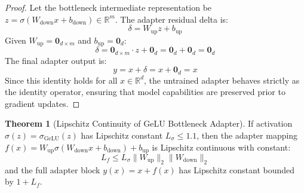 \documentclass[11pt,a4paper]{article}
\theoremstyle{definition}
\newtheorem{theorem}{\textbf{Theorem}}[section]
\begin{document}
\begin{proof}
Let the bottleneck intermediate representation be $z = \sigma(W_{\text{down}} x + b_{\text{down}}) \in \mathbb{R}^m$.
The adapter residual delta is:
{\boldmath
\begin{equation}
\delta = W_{\text{up}} z + b_{\text{up}}
\end{equation}
}
Given $W_{\text{up}} = \mathbf{0}_{d \times m}$ and $b_{\text{up}} = \mathbf{0}_d$:
{\boldmath
\begin{equation}
\delta = \mathbf{0}_{d \times m} \cdot z + \mathbf{0}_d = \mathbf{0}_d + \mathbf{0}_d = \mathbf{0}_d
\end{equation}
}
The final adapter output is:
{\boldmath
\begin{equation}
y = x + \delta = x + \mathbf{0}_d = x
\end{equation}
}
Since this identity holds for all $x \in \mathbb{R}^d$, the untrained adapter behaves strictly as the identity operator, ensuring that model capabilities are preserved prior to gradient updates.
\end{proof}

\begin{theorem}[Lipschitz Continuity of GeLU Bottleneck Adapter]
If activation $\sigma(z) = \sigma_{\text{GeLU}}(z)$ has Lipschitz constant $L_\sigma \le 1.1$, then the adapter mapping $f(x) = W_{\text{up}} \sigma(W_{\text{down}} x + b_{\text{down}}) + b_{\text{up}}$ is Lipschitz continuous with constant:
{\boldmath
\begin{equation}
L_f \le L_\sigma \|W_{\text{up}}\|_2 \|W_{\text{down}}\|_2
\end{equation}
}
and the full adapter block $y(x) = x + f(x)$ has Lipschitz constant bounded by $1 + L_f$.
\end{theorem}
\end{document}
